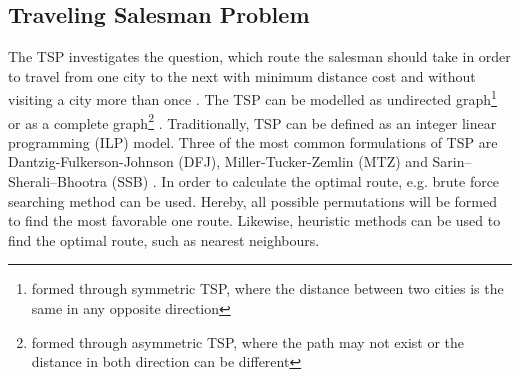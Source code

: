 \documentclass[conference]{IEEEtran}
\begin{document}
	\subsection{Traveling Salesman Problem}
	The TSP investigates the question, which route the salesman should take in order to travel from one city to the next with minimum distance cost and without visiting a city more than once \cite{bernhard2008combinatorial, tsp2019sheridan, moustapha2016advances}. The TSP can be modelled as undirected graph\footnote{formed through symmetric TSP, where the distance between two cities is the same in any opposite direction} or as a complete graph\footnote{formed through asymmetric TSP, where the path may not exist or the distance in both direction can be different} \cite{gutin2006traveling}. 
	Traditionally, TSP can be defined as an integer linear programming (ILP) model. Three of the most common formulations of TSP are Dantzig-Fulkerson-Johnson (DFJ), Miller-Tucker-Zemlin (MTZ) and Sarin–Sherali–Bhootra (SSB) \cite{moustapha2016advances, gutin2006traveling}. 
	In order to calculate the optimal route, e.g. brute force searching method can be used. Hereby, all possible permutations will be formed to find the most favorable one route. Likewise, heuristic methods can be used to find the optimal route, such as nearest neighbours\cite{halim2019combinatorial}.
	
\end{document}
